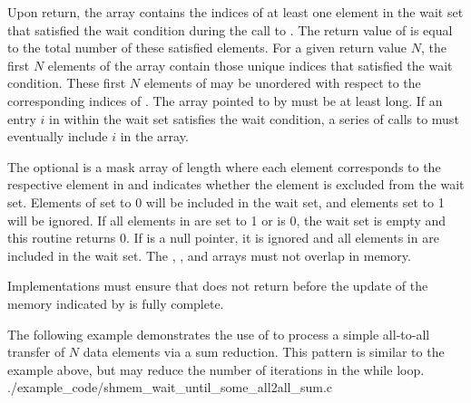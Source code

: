 \begin{apidefinition}
{    Upon return, the  array contains the indices of at least one
    element in the wait set that satisfied the wait condition during the call
    to .  The return value of
     is equal to the total number of these
    satisfied elements.  For a given return value $N$, the first $N$
    elements of the  array contain those unique indices that
    satisfied the wait condition.
    These first $N$ elements of  may be unordered with respect to
    the corresponding indices of .
    The array pointed to by  must
    be at least  long.  If an entry $i$ in  within the
    wait set satisfies the wait condition, a series of calls to
     must eventually include $i$ in the
     array.

    The optional  is a mask array of length  where each
    element corresponds to the respective element in  and indicates
    whether the element is excluded from the wait set.  Elements of
     set to 0 will be included in the wait set, and elements set to
    1 will be ignored.  If all elements in  are set to 1 or
     is 0, the wait set is empty and this routine returns 0.
    If  is a null pointer, it is ignored
    and all elements in  are included in the wait set.  The
    , , and  arrays must not overlap in
    memory.

    Implementations must ensure that  does not
    return before the update of the memory indicated by  is fully
    complete.
}




\begin{apiexamples}
  \apicexample
      {The following \Cstd[11] example demonstrates the use of
       to process a simple all-to-all transfer
      of $N$ data elements via a sum reduction.  This pattern is similar to the
       example above, but may reduce the number of
      iterations in the while loop.}
      {./example_code/shmem_wait_until_some_all2all_sum.c}
      {}

\end{apiexamples}

\end{apidefinition}
